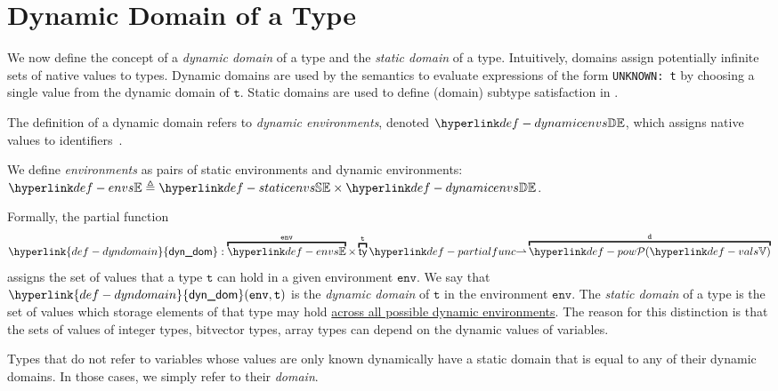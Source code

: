 \documentclass{book}
\newcommand\env[0]{\texttt{env}}
\newcommand\dynamicdomain[0]{\hyperlink{def-dyndomain}{\textsf{dyn\_dom}}}
\newcommand\vt[0]{\texttt{t}}
\begin{document}
\section{Dynamic Domain of a Type}
\hypertarget{def-dyndomain}{}

We now define the concept of a \emph{dynamic domain} of a type
and the \emph{static domain} of a type.
Intuitively, domains assign potentially infinite sets of native values to types.
Dynamic domains are used by the semantics to evaluate expressions of the form \texttt{UNKNOWN: t}
by choosing a single value from the dynamic domain of $\vt$.
Static domains are used to define (domain) subtype satisfaction in .

\hypertarget{def-dynamicenvs}{}
The definition of a dynamic domain refers to \emph{dynamic environments}, denoted $\dynamicenvs$,
which assigns native values to identifiers~\cite{ASLSemanticsReference}.

\hypertarget{def-envs}{}
We define \emph{environments} as pairs of static environments and dynamic environments:
$\envs \triangleq \staticenvs \times \dynamicenvs$.

Formally, the partial function
\[
  \dynamicdomain : \overname{\envs}{\env} \times \overname{\ty}{\vt}
  \partialto \overname{\pow{\vals}}{\vd}
\]
assigns the set of values that a type $\vt$ can hold in a given environment $\env$.
%
We say that $\dynamicdomain(\env, \vt)$ is the \emph{dynamic domain} of $\vt$
in the environment $\env$.
%
The \emph{static domain} of a type is the set of values which storage elements of that type may hold
\underline{across all possible dynamic environments}.
%
The reason for this distinction is that the sets of values
of integer types, bitvector types, array types can depend on the dynamic values of variables.

Types that do not refer to variables whose values are only known dynamically have
a static domain that is equal to any of their dynamic domains.
In those cases, we simply refer to their \emph{domain}.
\end{document}
